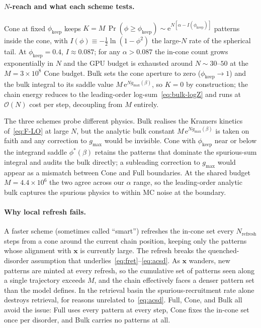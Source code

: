 \documentclass[letterpaper]{article} %
\newcommand{\bx}{\bm{x}}
\newcommand{\e}{{\mathrm{e}}}
\newcommand{\Bnet}{\beta}
\newcommand{\gmax}{g_{\max}}
\begin{document}
\paragraph{$N$-reach and what each scheme tests.}
Cone at fixed $\phi_{\mathrm{keep}}$ keeps
$K = M\,\Pr(\phi \ge \phi_{\mathrm{keep}}) \sim
\e^{N[\alpha - I(\phi_{\mathrm{keep}})]}$ patterns inside the cone, with
$I(\phi) \equiv -\tfrac12 \ln(1 - \phi^2)$ the large-$N$ rate of the
spherical tail.  At $\phi_{\mathrm{keep}} = 0.4$, $I \approx 0.087$;
for any $\alpha > 0.087$ the in-cone count grows exponentially in $N$ and
the GPU budget is exhausted around $N \sim 30$--$50$ at the
$M = 3 \times 10^8$ Cone budget.  Bulk sets the cone aperture to zero
($\phi_{\mathrm{keep}} \to 1$) and the bulk integral to its saddle value
$M\,\e^{N\gmax(\Bnet)}$, so $K = 0$ by construction; the chain energy
reduces to the leading-order log-sum~\eqref{eq:bulk-logZ} and runs at
$\mathcal{O}(N)$ cost per step, decoupling from $M$ entirely.

The three schemes probe different physics.  Bulk realises the
Kramers kinetics of~\eqref{eq:F-LO} at large $N$, but the analytic
bulk constant $M\,\e^{N\gmax(\Bnet)}$ is taken on faith and any correction
to $\gmax$ would be invisible.  Cone with $\phi_{\mathrm{keep}}$ near or
below the integrand saddle $\phi^{*}(\Bnet)$ retains the patterns that
dominate the spurious-sum integral and audits the bulk directly; a
subleading correction to $\gmax$ would appear as a mismatch between Cone
and Full boundaries.  At the shared budget $M = 4.4 \times 10^6$ the two
agree across our $\alpha$ range, so the leading-order analytic bulk
captures the spurious physics to within MC noise at the boundary.

\paragraph{Why local refresh fails.}
A faster scheme (sometimes called ``smart'') refreshes the in-cone set
every $N_{\mathrm{refresh}}$ steps from a cone around the current chain
position, keeping only the patterns whose alignment with $\bx$ is
currently large.  The refresh breaks the quenched-disorder assumption
that underlies~\eqref{eq:fret}--\eqref{eq:acsd}.  As $\bx$ wanders, new
patterns are minted at every refresh, so the cumulative set of patterns
seen along a single trajectory exceeds $M$, and the chain effectively
faces a denser pattern set than the model defines.  In the retrieval
basin the spurious-recruitment rate alone destroys retrieval, for
reasons unrelated to~\eqref{eq:acsd}.  Full, Cone, and Bulk all avoid
the issue: Full uses every pattern at every step, Cone fixes the in-cone
set once per disorder, and Bulk carries no patterns at all.
\end{document}
